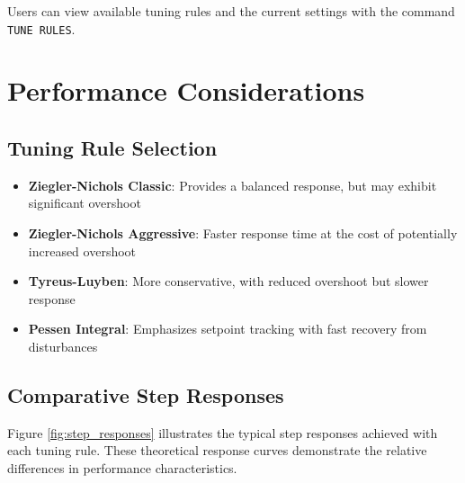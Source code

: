 \documentclass[a4paper,11pt]{article}
\begin{document}
Users can view available tuning rules and the current settings with the command \texttt{TUNE RULES}.

\section{Performance Considerations}

\subsection{Tuning Rule Selection}

\begin{itemize}
    \item \textbf{Ziegler-Nichols Classic}: Provides a balanced response, but may exhibit significant overshoot
    \item \textbf{Ziegler-Nichols Aggressive}: Faster response time at the cost of potentially increased overshoot
    \item \textbf{Tyreus-Luyben}: More conservative, with reduced overshoot but slower response
    \item \textbf{Pessen Integral}: Emphasizes setpoint tracking with fast recovery from disturbances
\end{itemize}

\subsection{Comparative Step Responses}

Figure \ref{fig:step_responses} illustrates the typical step responses achieved with each tuning rule. These theoretical response curves demonstrate the relative differences in performance characteristics.
\end{document}
